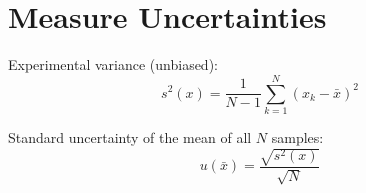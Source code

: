 \section{Measure Uncertainties}
Experimental variance (unbiased):
\begin{equation*}
  s^{2}(x) = \dfrac{1}{N-1} \sum_{k=1}^{N}{(x_{k} - \bar{x})}^{2}
\end{equation*}

Standard uncertainty of the mean of all $N$ samples:
\begin{equation*}
  u(\bar{x}) = \dfrac{\sqrt{s^{2}(x)}}{\sqrt{N}}
\end{equation*}
